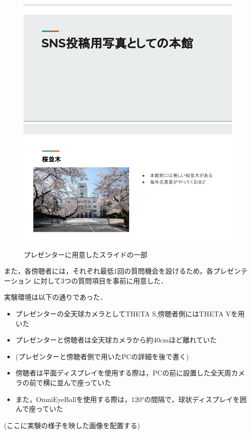\begin{figure}[tp]
  \centering
  \includegraphics[scale=0.7]{fig/slide1.png}
  \includegraphics[scale=0.7]{fig/slide2.png}
  \caption{プレゼンターに用意したスライドの一部}
\end{figure}

また，各傍聴者には，それぞれ最低1回の質問機会を設けるため，各プレゼンテーション
に対して3つの質問項目を事前に用意した．

実験環境は以下の通りであった．

\begin{itemize}
  \item プレゼンターの全天球カメラとしてTHETA S,傍聴者側にはTHETA Vを用いた
  \item プレゼンターと傍聴者は全天球カメラから約40cmほど離れていた
  \item (プレゼンターと傍聴者側で用いたPCの詳細を後で書く)
  \item 傍聴者は平面ディスプレイを使用する際は，PCの前に設置した全天周カメラの前で横に並んで座っていた
  \item また，OmniEyeBallを使用する際は，120°の間隔で，球状ディスプレイを囲んで座っていた
\end{itemize}

(ここに実験の様子を映した画像を配置する)

